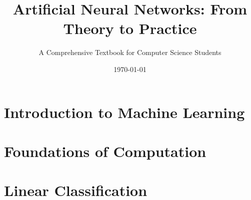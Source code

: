 \documentclass{book}
\title{Artificial Neural Networks: From Theory to Practice}
\author{A Comprehensive Textbook for Computer Science Students}
\date{\today}
\begin{document}
\maketitle
\tableofcontents

\chapter{Introduction to Machine Learning}


\chapter{Foundations of Computation}


\chapter{Linear Classification}

\end{document}
